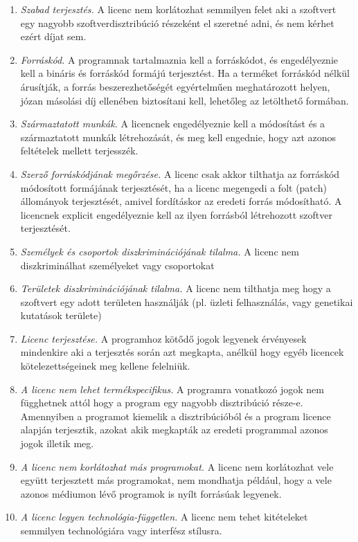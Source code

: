 \documentclass[12pt,magyar,a4paper,oneside]{scrreprt}
\begin{document}
\begin{enumerate}
\def\labelenumi{\arabic{enumi}.}
\item
  \emph{Szabad terjesztés.} A licenc nem korlátozhat semmilyen felet aki
  a szoftvert egy nagyobb szoftverdisztribúció részeként el szeretné
  adni, és nem kérhet ezért díjat sem.
\item
  \emph{Forráskód.} A programnak tartalmaznia kell a forráskódot, és
  engedélyeznie kell a bináris és forráskód formájú terjesztést. Ha a
  terméket forráskód nélkül árusítják, a forrás beszerezhetőségét
  egyértelműen meghatározott helyen, józan másolási díj ellenében
  biztosítani kell, lehetőleg az letölthető formában.
\item
  \emph{Származtatott munkák.} A licencnek engedélyeznie kell a
  módosítást és a származtatott munkák létrehozását, és meg kell
  engednie, hogy azt azonos feltételek mellett terjesszék.
\item
  \emph{Szerző forráskódjának megőrzése.} A licenc csak akkor tilthatja
  az forráskód módosított formájának terjesztését, ha a licenc megengedi
  a folt (patch) állományok terjesztését, amivel fordításkor az eredeti
  forrás módosítható. A licencnek explicit engedélyeznie kell az ilyen
  forrásból létrehozott szoftver terjesztését.
\item
  \emph{Személyek és csoportok diszkriminációjának tilalma.} A licenc
  nem diszkriminálhat személyeket vagy csoportokat
\item
  \emph{Területek diszkriminációjának tilalma.} A licenc nem tilthatja
  meg hogy a szoftvert egy adott területen használják (pl. üzleti
  felhasználás, vagy genetikai kutatások területe)
\item
  \emph{Licenc terjesztése.} A programhoz kötődő jogok legyenek
  érvényesek mindenkire aki a terjesztés során azt megkapta, anélkül
  hogy egyéb licencek kötelezettségeinek meg kellene felelniük.
\item
  \emph{A licenc nem lehet termékspecifikus.} A programra vonatkozó
  jogok nem függhetnek attól hogy a program egy nagyobb disztribúció
  része-e. Amennyiben a programot kiemelik a disztribúcióból és a
  program licence alapján terjesztik, azokat akik megkapták az eredeti
  programmal azonos jogok illetik meg.
\item
  \emph{A licenc nem korlátozhat más programokat.} A licenc nem
  korlátozhat vele együtt terjesztett más programokat, nem mondhatja
  például, hogy a vele azonos médiumon lévő programok is nyílt forrásúak
  legyenek.
\item
  \emph{A licenc legyen technológia-független.} A licenc nem tehet
  kitételeket semmilyen technológiára vagy interfész stílusra.
\end{enumerate}
\end{document}
